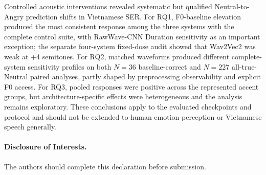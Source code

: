 \documentclass[a4paper,runningheads]{llncs}
\begin{document}
Controlled acoustic interventions revealed systematic but qualified Neutral-to-Angry prediction shifts in Vietnamese SER. For RQ1, F0-baseline elevation produced the most consistent response among the three systems with the complete control suite, with RawWave-CNN Duration sensitivity as an important exception; the separate four-system fixed-dose audit showed that Wav2Vec2 was weak at +4 semitones. For RQ2, matched waveforms produced different complete-system sensitivity profiles on both $N=36$ baseline-correct and $N=227$ all-true-Neutral paired analyses, partly shaped by preprocessing observability and explicit F0 access. For RQ3, pooled responses were positive across the represented accent groups, but architecture-specific effects were heterogeneous and the analysis remains exploratory. These conclusions apply to the evaluated checkpoints and protocol and should not be extended to human emotion perception or Vietnamese speech generally.

\paragraph{Disclosure of Interests.} The authors should complete this declaration before submission.



\end{document}
